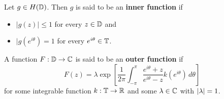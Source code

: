 \begin{definition}
    Let $g \in H(\mathbb D)$. Then $g$ is said to be an \textbf{inner function} if 
    \begin{itemize}
	\item $|g(z)|\le 1$ for every $z \in \mathbb D$ and
	\item $|g\left( e^{i\theta} \right) = 1$ for every $e^{i\theta} \in \mathbb T$.
    \end{itemize}
    A function $F: \mathbb D \to \mathbb C$ is said to be an \textbf{outer function} if 
    \begin{equation*}
	F(z) = \lambda \exp \left[ \frac{1}{2\pi} \int_{-\pi}^{\pi} \frac{e^{i\theta} + z}{e^{i\theta}-z} k\left( e^{i\theta} \right)  \, d\theta
\right]     \end{equation*}
for some integrable function $k : \mathbb T \to \mathbb R$ and some $\lambda \in \mathbb C$ with $\left\lvert \lambda \right\rvert=1$.
    \label{def:inner-outer-function}
\end{definition}

